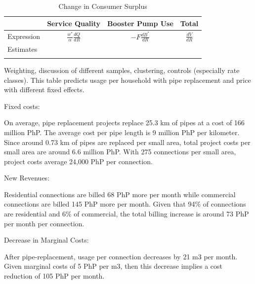 \documentclass[12pt,table]{article}
\begin{document}
\begin{table}[h!] 
\centering
\caption{Change in Consumer Surplus}\label{table:mainregs}
\vspace{-2mm}
\begin{threeparttable}
\begin{tabular}{@{}l*{1}{CCC}@{}}
\toprule
            & Service Quality              & Booster Pump Use & Total             \\
\midrule
Expression  & $\frac{w^{*}}{\alpha} \frac{dQ}{dR}$ &   $- F \frac{dB^{*}}{dR}$  & $\frac{dV}{dR}$ \\[1em]
Estimates   &   \\
            &    \\
\bottomrule
\end{tabular}
\begin{tablenotes}
\footnotesize
\item Weighting, discussion of different samples, clustering, controls (especially rate classes).  This table predicts usage per household with pipe replacement and price with different fixed effects.  
\end{tablenotes}
\end{threeparttable}
\end{table}







Fixed costs:

On average, pipe replacement projects replace 25.3 km of pipes at a cost of 166 million PhP.  The average cost per pipe length is 9 million PhP per kilometer.  Since around 0.73 km of pipes are replaced per small area, total project costs per small area are around 6.6 million PhP.  With 275 connections per small area, project costs average 24,000 PhP per connection.   

New Revenues:

Residential connections are billed 68 PhP more per month while commercial connections are billed 145 PhP more per month.  Given that 94\% of connections are residential and 6\% of commercial, the total billing increase is around 73 PhP per month per connection.  

Decrease in Marginal Costs:

After pipe-replacement, usage per connection decreases by 21 m3 per month.  Given marginal costs of 5 PhP per m3, then this decrease implies a cost reduction of 105 PhP per month.  
\end{document}

